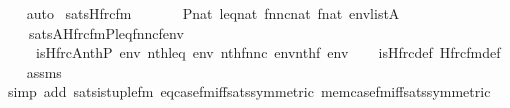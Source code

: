 \begin{isabellebody}
\ \ \isamarkupfalse%
\ auto%
\endisatagproof
{\isafoldproof}%
%
\isadelimproof
\isanewline
%
\endisadelimproof
\isanewline
{}\isamarkupfalse%
\ sats{\isacharunderscore}{\kern0pt}Hfrc{\isacharunderscore}{\kern0pt}fm{\isacharcolon}{\kern0pt}\isanewline
\ \ \isanewline
\ \ \ \ {\isachardoublequoteopen}P{\isasymin}nat{\isachardoublequoteclose}\ {\isachardoublequoteopen}leq{\isasymin}nat{\isachardoublequoteclose}\ {\isachardoublequoteopen}fnnc{\isasymin}nat{\isachardoublequoteclose}\ {\isachardoublequoteopen}f{\isasymin}nat{\isachardoublequoteclose}\ {\isachardoublequoteopen}env{\isasymin}list{\isacharparenleft}{\kern0pt}A{\isacharparenright}{\kern0pt}{\isachardoublequoteclose}\isanewline
\ \ \isanewline
\ \ \ \ {\isachardoublequoteopen}sats{\isacharparenleft}{\kern0pt}A{\isacharcomma}{\kern0pt}Hfrc{\isacharunderscore}{\kern0pt}fm{\isacharparenleft}{\kern0pt}P{\isacharcomma}{\kern0pt}leq{\isacharcomma}{\kern0pt}fnnc{\isacharcomma}{\kern0pt}f{\isacharparenright}{\kern0pt}{\isacharcomma}{\kern0pt}env{\isacharparenright}{\kern0pt}\isanewline
\ \ \ \ {\isasymlongleftrightarrow}\ is{\isacharunderscore}{\kern0pt}Hfrc{\isacharparenleft}{\kern0pt}{\isacharhash}{\kern0pt}{\isacharhash}{\kern0pt}A{\isacharcomma}{\kern0pt}nth{\isacharparenleft}{\kern0pt}P{\isacharcomma}{\kern0pt}\ env{\isacharparenright}{\kern0pt}{\isacharcomma}{\kern0pt}\ nth{\isacharparenleft}{\kern0pt}leq{\isacharcomma}{\kern0pt}\ env{\isacharparenright}{\kern0pt}{\isacharcomma}{\kern0pt}\ nth{\isacharparenleft}{\kern0pt}fnnc{\isacharcomma}{\kern0pt}\ env{\isacharparenright}{\kern0pt}{\isacharcomma}{\kern0pt}nth{\isacharparenleft}{\kern0pt}f{\isacharcomma}{\kern0pt}\ env{\isacharparenright}{\kern0pt}{\isacharparenright}{\kern0pt}{\isachardoublequoteclose}\isanewline
%
\isadelimproof
\ \ %
\endisadelimproof
%
\isatagproof
{}\isamarkupfalse%
\ is{\isacharunderscore}{\kern0pt}Hfrc{\isacharunderscore}{\kern0pt}def\ Hfrc{\isacharunderscore}{\kern0pt}fm{\isacharunderscore}{\kern0pt}def\isanewline
\ \ \isamarkupfalse%
\ assms\ \ \isanewline
\ \ \isamarkupfalse%
\ {\isacharparenleft}{\kern0pt}simp\ add{\isacharcolon}{\kern0pt}\ sats{\isacharunderscore}{\kern0pt}is{\isacharunderscore}{\kern0pt}tuple{\isacharunderscore}{\kern0pt}fm\ eq{\isacharunderscore}{\kern0pt}case{\isacharunderscore}{\kern0pt}fm{\isacharunderscore}{\kern0pt}iff{\isacharunderscore}{\kern0pt}sats{\isacharbrackleft}{\kern0pt}symmetric{\isacharbrackright}{\kern0pt}\ mem{\isacharunderscore}{\kern0pt}case{\isacharunderscore}{\kern0pt}fm{\isacharunderscore}{\kern0pt}iff{\isacharunderscore}{\kern0pt}sats{\isacharbrackleft}{\kern0pt}symmetric{\isacharbrackright}{\kern0pt}{\isacharparenright}{\kern0pt}%

\end{isabellebody}

